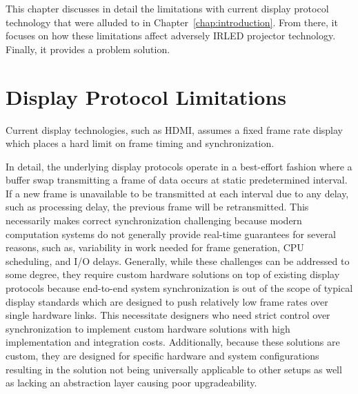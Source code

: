 \label{chap:problem_formulation}

This chapter discusses in detail the limitations with current display protocol technology that were alluded to in Chapter~\ref{chap:introduction}. From there, it focuses on how these limitations affect adversely IRLED projector technology. Finally, it provides a problem solution.

\section{Display Protocol Limitations}


    Current display technologies, such as HDMI, assumes a fixed frame rate display which places a hard limit on frame timing and synchronization.

    In detail, the underlying display protocols operate in a best-effort fashion where a buffer swap transmitting a frame of data occurs at static predetermined interval. If a new frame is unavailable to be transmitted at each interval due to any delay, such as processing delay, the previous frame will be retransmitted. This necessarily makes correct synchronization challenging because modern computation systems do not generally provide real-time guarantees for several reasons, such as, variability in work needed for frame generation, CPU scheduling, and I/O delays. Generally, while these challenges can be addressed to some degree, they require custom hardware solutions on top of existing display protocols because end-to-end system synchronization is out of the scope of typical display standards which are designed to push relatively low frame rates over single hardware links. This necessitate designers who need strict control over synchronization to implement custom hardware solutions with high implementation and integration costs. Additionally, because these solutions are custom, they are designed for specific hardware and system configurations resulting in the solution not being universally applicable to other setups as well as lacking an abstraction layer causing poor upgradeability.

